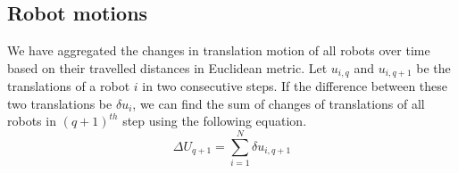 \documentclass[final,5p,times,twocolumn]{elsarticle}
\begin{document}
\subsection*{Robot motions}
We have aggregated the changes in translation motion of all robots over time based on their travelled distances in Euclidean metric. Let $u_{i,q}$ and $u_{i,q+1}$ be the translations of a robot $i$ in two consecutive steps. If the difference between these two translations be $\delta u_{i}$, we can find the sum of changes of translations of all robots in $(q+1)^{th}$ step using the following equation.
\begin{equation}
\Delta U_{q+1} = \sum_{i=1}^{N} \delta u_{i, q+1} 
\label{eqn:Delta-Tr}
\end{equation}
\begin{figure}
\centering
{}
\newline
{}

\end{figure}
\end{document}
